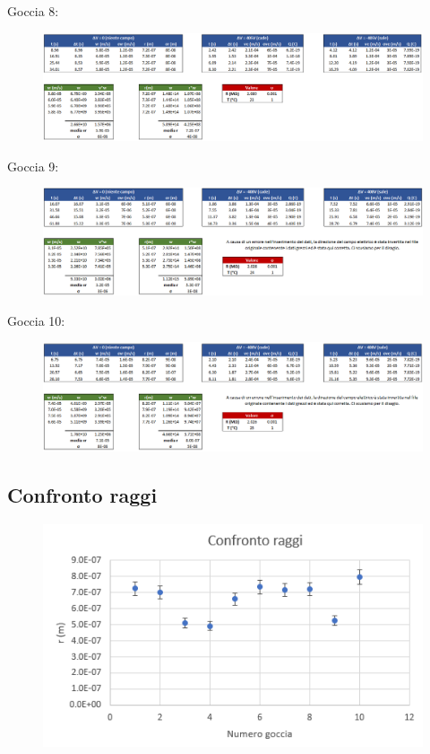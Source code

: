 \documentclass{article}
\begin{document}
\vspace{10mm}

Goccia 8:

\begin{figure}[h]
\centering
\includegraphics[width=\linewidth]{Goccia8}
\end{figure}

\pagebreak

Goccia 9:

\begin{figure}[h]
\centering
\includegraphics[width=\linewidth]{Goccia9}
\end{figure}

\vspace{10mm}

Goccia 10:

\begin{figure}[h]
\centering
\includegraphics[width=\linewidth]{Goccia10}
\end{figure}

\subsection{Confronto raggi}

\begin{figure}[h]
\centering
\includegraphics[width=0.6\linewidth]{Confronto_r_1}
\end{figure}
\end{document}

